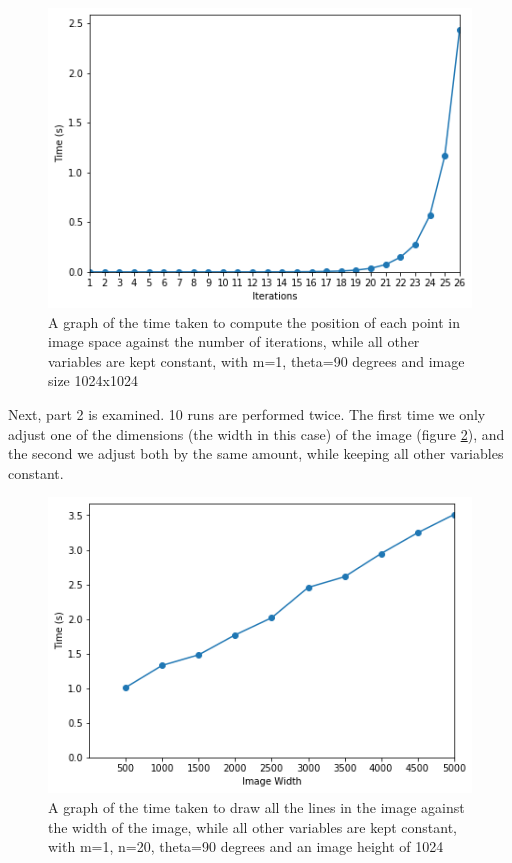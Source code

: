 \begin{figure}
	\label{fig:iterVStime}
	\includegraphics[width=\linewidth]{Images/iterationsVStime.png}
	\centering
	\caption{A graph of the time taken to compute the position of each point in image space against the number of iterations, while all other variables are kept constant, with m=1, theta=90 degrees and image size 1024x1024}
\end{figure}

Next, part 2 is examined. 10 runs are performed twice. The first time we only adjust one of the dimensions (the width in this case) of the image (figure \ref{fig:widthVStime}), and the second we adjust both by the same amount, while keeping all other variables constant.

\begin{figure}
	\label{fig:widthVStime}
	\includegraphics[width=\linewidth]{Images/widthVStime.png}
	\centering
	\caption{A graph of the time taken to draw all the lines in the image against the width of the image, while all other variables are kept constant, with m=1, n=20, theta=90 degrees and an image height of 1024}
\end{figure}

